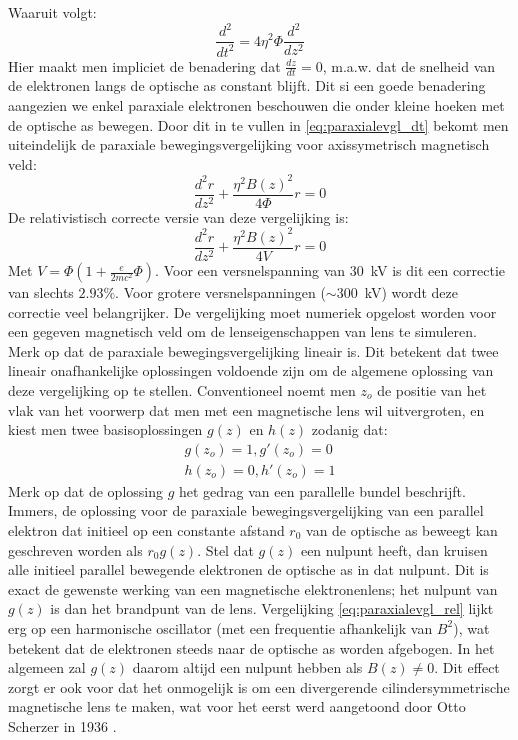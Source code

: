 \documentclass[we,twoside,openright,a4paper,11pt]{uantwerpenbamathesis}
\begin{document}
Waaruit volgt:
\begin{equation}
    \frac{d^2}{dt^2}=4\eta^2\Phi\frac{d^2}{dz^2}
\end{equation}
Hier maakt men impliciet de benadering dat $\frac{dz}{dt}=0$, m.a.w. dat de snelheid van de elektronen langs de optische as constant blijft. Dit si een goede benadering aangezien we enkel paraxiale elektronen beschouwen die onder kleine hoeken met de optische as bewegen. Door dit in te vullen in \ref{eq:paraxialevgl_dt} bekomt men uiteindelijk de paraxiale bewegingsvergelijking voor axissymetrisch magnetisch veld:
\begin{equation}\label{eq:paraxialevgl}
    \frac{d^2r}{dz^2}+\frac{\eta^2B(z)^2}{4\Phi}r=0
\end{equation}
De relativistisch correcte versie van deze vergelijking is:
\begin{equation}\label{eq:paraxialevgl_rel}
    \frac{d^2r}{dz^2}+\frac{\eta^2B(z)^2}{4V}r=0
\end{equation}
Met $V=\Phi\left(1+\frac{e}{2mc^2}\Phi\right)$. Voor een versnelspanning van $30$~kV is dit een correctie van slechts $2.93\%$. Voor grotere versnelspanningen ($\sim300$~kV) wordt deze correctie veel belangrijker. De vergelijking moet numeriek opgelost worden voor een gegeven magnetisch veld om de lenseigenschappen van lens te simuleren. \\

Merk op dat de paraxiale bewegingsvergelijking lineair is. Dit betekent dat twee lineair onafhankelijke oplossingen voldoende zijn om de algemene oplossing van deze vergelijking op te stellen. Conventioneel noemt men $z_o$ de positie van het vlak van het voorwerp dat men met een magnetische lens wil uitvergroten, en kiest men twee basisoplossingen $g(z)$ en $h(z)$ zodanig dat:
\begin{align}\label{eq:BVW}
    g(z_o)=1, g'(z_o)=0 \\[6pt]
    h(z_o)=0, h'(z_o)=1
\end{align}
Merk op dat de oplossing $g$ het gedrag van een parallelle bundel beschrijft. Immers, de oplossing voor de paraxiale bewegingsvergelijking van een parallel elektron dat initieel op een constante afstand $r_0$ van de optische as beweegt kan geschreven worden als $r_0g(z)$. Stel dat $g(z)$ een nulpunt heeft, dan kruisen alle initieel parallel bewegende elektronen de optische as in dat nulpunt. Dit is exact de gewenste werking van een magnetische elektronenlens; het nulpunt van $g(z)$ is dan het brandpunt van de lens. Vergelijking \ref{eq:paraxialevgl_rel} lijkt erg op een harmonische oscillator (met een frequentie afhankelijk van $B^2$), wat betekent dat de elektronen steeds naar de optische as worden afgebogen. In het algemeen zal $g(z)$ daarom altijd een nulpunt hebben als $B(z)\neq0$. Dit effect zorgt er ook voor dat het onmogelijk is om een divergerende cilindersymmetrische magnetische lens te maken, wat voor het eerst werd aangetoond door Otto Scherzer in 1936 \cite{scherzer1936}.
\end{document}
